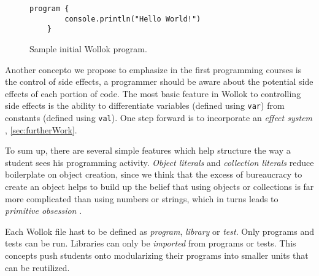 \begin{figure}[h]
 \centering
 \begin{lstlisting}[language=Wollok]
	program {
		console.println("Hello World!")
	}
 \end{lstlisting}
 
 \caption{\small Sample initial Wollok program.}
 \label{fig:helloWorld/wollok}
\end{figure}

\medskip
Another concepto we propose to emphasize in the first programming courses is the control of side effects, 
\ie a programmer should be aware about the potential side effects of each portion of code.
The most basic feature in Wollok to controlling side effects is the ability to 
differentiate variables (defined using \lstinline[language=Wollok]{var})
from constants (defined using \lstinline[language=Wollok]{val}).
One step forward is to incorporate an \emph{effect system} \cite{effect system}, \cf \ref{sec:furtherWork}.

\medskip
To sum up, there are several simple features which help structure the way a student sees his programming activity.
\emph{Object literals} and \emph{collection literals} reduce boilerplate on object creation, 
since we think that the excess of bureaucracy to create an object helps to build up 
the belief that using objects or collections is far more complicated than using numbers or strings, which in turns leads to \emph{primitive obsession} \cite{primitive obsession}.

Each Wollok file hast to be defined as \emph{program}, \emph{library} or \emph{test}.
Only programs and tests can be run. Libraries can only be \emph{imported} from programs or tests.
This concepts push students onto modularizing their programs into smaller units that can be reutilized.
